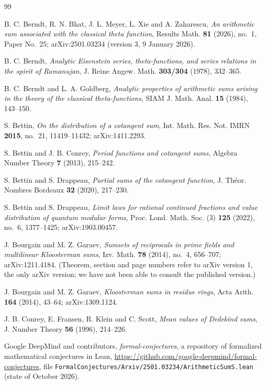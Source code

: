 \begin{thebibliography}{99}

 B. C. Berndt, R. N. Bhat, J. L. Meyer, L. Xie and A. Zaharescu, \emph{An arithmetic sum associated with the classical theta function}, Results Math. \textbf{81} (2026), no.~1, Paper No.~25; arXiv:2501.03234 (version 3, 9 January 2026).

 B. C. Berndt, \emph{Analytic Eisenstein series, theta-functions, and series relations in the spirit of Ramanujan}, J. Reine Angew. Math. \textbf{303/304} (1978), 332--365.

 B. C. Berndt and L. A. Goldberg, \emph{Analytic properties of arithmetic sums arising in the theory of the classical theta-functions}, SIAM J. Math. Anal. \textbf{15} (1984), 143--150.

 S. Bettin, \emph{On the distribution of a cotangent sum}, Int. Math. Res. Not. IMRN \textbf{2015}, no.~21, 11419--11432; arXiv:1411.2293.

 S. Bettin and J. B. Conrey, \emph{Period functions and cotangent sums}, Algebra Number Theory \textbf{7} (2013), 215--242.

 S. Bettin and S. Drappeau, \emph{Partial sums of the cotangent function}, J. Th\'eor. Nombres Bordeaux \textbf{32} (2020), 217--230.

 S. Bettin and S. Drappeau, \emph{Limit laws for rational continued fractions and value distribution of quantum modular forms}, Proc. Lond. Math. Soc. (3) \textbf{125} (2022), no.~6, 1377--1425; arXiv:1903.00457.

 J. Bourgain and M. Z. Garaev, \emph{Sumsets of reciprocals in prime fields and multilinear Kloosterman sums}, Izv. Math. \textbf{78} (2014), no.~4, 656--707; arXiv:1211.4184. (Theorem, section and page numbers refer to arXiv version 1, the only arXiv version; we have not been able to consult the published version.)

 J. Bourgain and M. Z. Garaev, \emph{Kloosterman sums in residue rings}, Acta Arith. \textbf{164} (2014), 43--64; arXiv:1309.1124.

 J. B. Conrey, E. Fransen, R. Klein and C. Scott, \emph{Mean values of Dedekind sums}, J. Number Theory \textbf{56} (1996), 214--226.

 Google DeepMind and contributors, \emph{formal-conjectures}, a repository of formalized mathematical conjectures in Lean, \url{https://github.com/google-deepmind/formal-conjectures}, file \texttt{FormalConjectures/Arxiv/2501.03234/ArithmeticSumS.lean} (state of October 2026).


\end{thebibliography}
